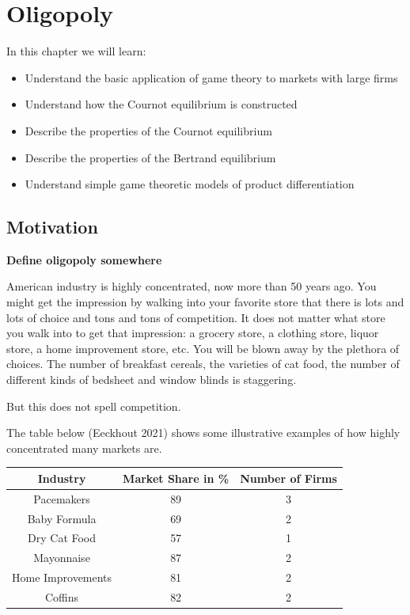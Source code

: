 \documentclass[
]{book}
\providecommand{\tightlist}{%
  \setlength{\itemsep}{0pt}\setlength{\parskip}{0pt}}
\begin{document}
\hypertarget{oligopoly}{%
\chapter{Oligopoly}\label{oligopoly}}

In this chapter we will learn:

\begin{itemize}
\tightlist
\item
  Understand the basic application of game theory to markets with large firms
\item
  Understand how the Cournot equilibrium is constructed
\item
  Describe the properties of the Cournot equilibrium
\item
  Describe the properties of the Bertrand equilibrium
\item
  Understand simple game theoretic models of product differentiation
\end{itemize}

\hypertarget{motivation-1}{%
\section{Motivation}\label{motivation-1}}

\begin{addition}
\textbf{Define oligopoly somewhere}

\end{addition}

American industry is highly concentrated, now more than 50 years ago. You might get the impression by walking into your favorite store that there is lots and lots of choice and tons and tons of competition. It does not matter what store you walk into to get that impression: a grocery store, a clothing store, liquor store, a home improvement store, etc. You will be blown away by the plethora of choices. The number of breakfast cereals, the varieties of cat food, the number of different kinds of bedsheet and window blinds is staggering.

But this does not spell competition.

The table below (Eeckhout 2021) shows some illustrative examples of how highly concentrated many markets are.

\begin{longtable}[]{@{}ccc@{}}
\toprule
Industry & Market Share in \% & Number of Firms \\
\midrule
\endhead
Pacemakers & 89 & 3 \\
Baby Formula & 69 & 2 \\
Dry Cat Food & 57 & 1 \\
Mayonnaise & 87 & 2 \\
Home Improvements & 81 & 2 \\
Coffins & 82 & 2 \\
\bottomrule
\end{longtable}
\end{document}
